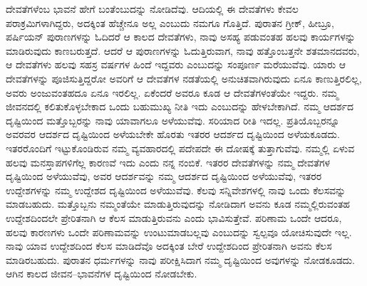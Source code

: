 ದೇವತೆಗಳೆಂಬ ಭಾವನೆ ಹೇಗೆ ಬಂತೆಂಬುದನ್ನು ನೋಡಿದೆವು. ಆದಿಯಲ್ಲಿ ಈ ದೇವತೆಗಳು ಕೇವಲ ಪರಾಕ್ರಮಿಗಳಾಗಿದ್ದರು, ಅದಕ್ಕಿಂತ ಹೆಚ್ಚೇನೂ ಅಲ್ಲ ಎಂಬುದು ನಮಗೂ ಗೊತ್ತಿದೆ. ಪುರಾತನ ಗ್ರೀಕ್​, ಹೀಬ್ರೂ, ಪರ್ಷಿಯನ್​ ಪುರಾಣಗಳನ್ನು ಓದಿದರೆ ಆ ಕಾಲದ ದೇವತೆಗಳು, ನಾವು ಅಸಹ್ಯ ಪಡುವಂತಹ ಹಲವು ಕಾರ್ಯಗಳನ್ನು ಮಾಡಿರುವುದು ಕಾಣಬರುತ್ತದೆ. ಆದರೆ ಆ ಪುರಾಣಗಳನ್ನು ಓದುತ್ತಿರುವಾಗ, ನಾವು ಹತ್ತೊಂಬತ್ತನೇ ಶತಮಾನದವರು, ಆ ದೇವತೆಗಳು ಹಲವು ಸಹಸ್ರ ವರ್ಷಗಳ ಹಿಂದೆ ಇದ್ದವರು ಎಂಬುದನ್ನು ಸಂಪೂರ್ಣ ಮರೆಯುವೆವು. ಯಾರು ಆ ದೇವತೆಗಳನ್ನು ಪೂಜಿಸುತ್ತಿದ್ದರೋ ಅವರಿಗೆ ಆ ದೇವತೆಗಳ ನಡತೆಯಲ್ಲಿ ಅನುಚಿತವಾಗಿರುವುದು ಏನೂ ಕಾಣುತ್ತಿರಲಿಲ್ಲ, ಅವರು ಅಂಜುವಂತಹದೂ ಏನೂ ಇರಲಿಲ್ಲ. ಏಕೆಂದರೆ ಅವರೂ ಕೂಡ ಆ ದೇವತೆಗಳಂತೆಯೇ ಇದ್ದರು. ನಮ್ಮ ಜೀವನದಲ್ಲಿ ಕಲಿತುಕೊಳ್ಳಬೇಕಾದ ಒಂದು ಬಹುಮುಖ್ಯ ನೀತಿ ಇದು ಎಂಬುದನ್ನು ಹೇಳಬೇಕಾಗಿದೆ. ನಮ್ಮ ಆದರ್ಶದ ದೃಷ್ಟಿಯಿಂದ ಮತ್ತೊಬ್ಬರನ್ನು ನಾವು ಯಾವಾಗಲೂ ಅಳೆಯುವೆವು. ಸರಿಯಾದ ರೀತಿ ಇದಲ್ಲ. ಪ್ರತಿಯೊಬ್ಬರನ್ನೂ ಅವರವರ ಆದರ್ಶದ ದೃಷ್ಟಿಯಿಂದ ಅಳೆಯಬೇಕೇ ಹೊರತು ಇತರರ ಆದರ್ಶದ ದೃಷ್ಟಿಯಿಂದ ಅಳೆಯಕೂಡದು. ಇತರರೊಂದಿಗೆ ಇಟ್ಟುಕೊಂಡಿರುವ ನಮ್ಮ ವ್ಯವಹಾರದಲ್ಲಿ ಪದೇಪದೇ ಈ ದೋಷಕ್ಕೆ ತುತ್ತಾಗುವೆವು. ನಮ್ಮಲ್ಲಿ ಏಳುವ ಹಲವು ಮನಸ್ತಾಪಗಳಿಗೆಲ್ಲ ಕಾರಣವೆ ಇದು ಎಂದು ನನ್ನ ನಂಬಿಕೆ. ಇತರರ ದೇವತೆಗಳನ್ನು ನಮ್ಮ ದೇವತೆಗಳ ದೃಷ್ಟಿಯಿಂದ ಅಳೆಯುವೆವು, ಅವರ ಆದರ್ಶವನ್ನು ನಮ್ಮ ಆದರ್ಶದ ದೃಷ್ಟಿಯಿಂದ ಅಳೆಯುವೆವು, ಇತರರ ಉದ್ದೇಶಗಳನ್ನು ನಮ್ಮ ಉದ್ದೇಶದ ದೃಷ್ಟಿಯಿಂದ ಅಳೆಯುವೆವು. ಕೆಲವು ಸನ್ನಿವೇಶಗಳಲ್ಲಿ ನಾವು ಒಂದು ಕೆಲಸವನ್ನು ಮಾಡಬಹುದು. ಮತ್ತೊಬ್ಬನು ನಮ್ಮಂತೆಯೇ ಮಾಡುತ್ತಿರುವುದನ್ನು ನೋಡಿದಾಗ ಅವನು ಕೂಡ ನಮ್ಮಲ್ಲಿರುವಂತಹ ಉದ್ದೇಶದಿಂದಲೇ ಪ್ರೇರಿತನಾಗಿ ಆ ಕೆಲಸ ಮಾಡುತ್ತಿರುವನು ಎಂದು ಭಾವಿಸುತ್ತೇವೆ. ಪರಿಣಾಮ ಒಂದೇ ಆದರೂ, ಹಲವು ಕಾರಣಗಳು ಒಂದೇ ಪರಿಣಾಮವನ್ನು ಉಂಟುಮಾಡಬಲ್ಲವು ಎಂಬುದನ್ನು ಸ್ವಲ್ಪವೂ ಯೋಚಿಸುವುದೇ ಇಲ್ಲ. ನಾವು ಯಾವ ಉದ್ದೇಶದಿಂದ ಕೆಲಸ ಮಾಡಿದೆವೊ ಅದಕ್ಕಿಂತ ಬೇರೆ ಉದ್ದೇಶದಿಂದ ಪ್ರೇರಿತನಾಗಿ ಅವನು ಕೆಲಸ ಮಾಡಿರಬಹುದು. ಪುರಾತನ ಧರ್ಮಗಳನ್ನು ನಾವು ಪರೀಕ್ಷಿಸಿದಾಗ ನಮ್ಮ ದೃಷ್ಟಿಯಿಂದ ಅವುಗಳನ್ನು ನೋಡಕೂಡದು. ಆಗಿನ ಕಾಲದ ಜೀವನ–ಭಾವನೆಗಳ ದೃಷ್ಟಿಯಿಂದ ನೋಡಬೇಕು.

\vskip 0.2cm

